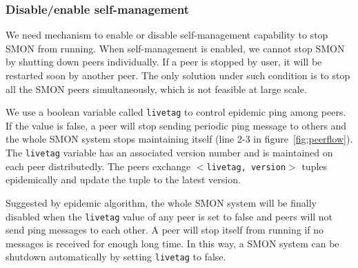 
\subsubsection{Disable/enable self-management}
\label{subsec:livetag}

We need mechanism to enable or disable self-management
capability to stop SMON from running. When self-management
is enabled, we cannot stop SMON by shutting down peers
individually.  If a peer is stopped by user, it will be
restarted soon by another peer. The only solution under such
condition is to stop all the SMON peers simultaneously,
which is not feasible at large scale.

We use a boolean variable called \texttt{livetag} to control
epidemic ping among peers. If the value is false, a peer
will stop sending periodic ping message to others and the
whole SMON system stops maintaining itself (line 2-3 in
figure~\ref{fig:peerflow}).
The \texttt{livetag} variable has an associated version
number and is maintained on each peer distributedly. The
peers exchange \texttt{$<$livetag, version$>$} tuples
epidemically and update the tuple to the latest version.

Suggested by epidemic algorithm, the whole SMON system will
be finally disabled when the \texttt{livetag} value of any
peer is set to false and peers will not send ping messages
to each other. A peer will stop itself from running if no
messages is received for enough long time. In this way, a
SMON system can be shutdown automatically by setting
\texttt{livetag} to false.


%


